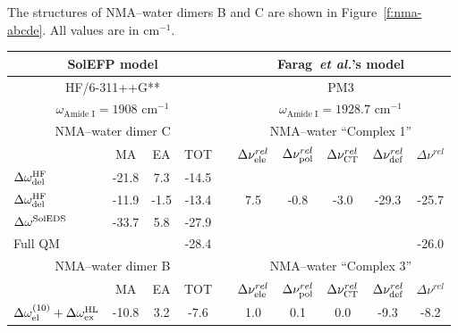 \documentclass[b5paper,oneside,fleqn,11pt]{book}
\begin{document}
\begin{refsection}
\begin{table}
{The structures of NMA--water dimers B and C are shown in
Figure~\ref{f:nma-abcde}. All values are in cm$^{-1}$.
\label{t:farag}}
\begin{tabular*}{1.0\textwidth}{@{\extracolsep{\fill} } lccccccccc}
\hline\hline
\multicolumn{4}{c}{SolEFP model}       && \multicolumn{5}{c}{Farag~\emph{et al.}'s model} \\
\hline
\multicolumn{4}{c}{HF/6-311++G**}      && \multicolumn{5}{c}{PM3} \\
   \multicolumn{4}{c}{$\omega_{\text{Amide I}}=1908\text{ cm}^{-1}$}      
&& \multicolumn{5}{c}{$\omega_{\text{Amide I}}=1928.7\text{ cm}^{-1}$} \\
%
\hline
%
\multicolumn{4}{c}{NMA--water dimer C} && \multicolumn{5}{c}{NMA--water ``Complex 1''} \\
\cline{1-4} \cline{6-10}
 & MA & EA & TOT && $\Delta\nu_{\rm ele}^{rel}$ & $\Delta\nu_{\rm pol}^{rel}$ & $\Delta\nu_{\rm CT}^{rel}$ & $\Delta\nu_{\rm def}^{rel}$ &
                       $\Delta\nu^{rel}$ \\
\cline{2-4} \cline{6-10}
 $\Delta\omega^{\rm HF}_{\rm del}$  
          & -21.8 &  7.3  & -14.5 && \multirow{3}{*}{  7.5} &
                                     \multirow{3}{*}{ -0.8} &
                                     \multirow{3}{*}{ -3.0} &
                                     \multirow{3}{*}{-29.3} &
                                     \multirow{3}{*}{-25.7} \\ 
 $\Delta\omega^{\rm HF}_{\rm del}$    
          & -11.9 & -1.5  & -13.4 && & & & &       \\
 $\Delta\omega^{\rm SolEDS}$    
          & -33.7 &  5.8  & -27.9 && & & & &       \\
 Full QM  &      &        & -28.4 && & & & & -26.0 \\
%
\hline
%
\multicolumn{4}{c}{NMA--water dimer B} && \multicolumn{5}{c}{NMA--water ``Complex 3''} \\
\cline{1-4} \cline{6-10}
 & MA & EA & TOT && $\Delta\nu_{\rm ele}^{rel}$ & $\Delta\nu_{\rm pol}^{rel}$ & $\Delta\nu_{\rm CT}^{rel}$ & $\Delta\nu_{\rm def}^{rel}$ &
                       $\Delta\nu^{rel}$ \\
\cline{2-4} \cline{6-10}
 $\Delta\omega^{(10)}_{\rm el}+\Delta\omega^{\rm HL}_{\rm ex}$ 
          & -10.8 &  3.2  &  -7.6 && \multirow{3}{*}{  1.0} &
                                     \multirow{3}{*}{  0.1} &
                                     \multirow{3}{*}{  0.0} &
                                     \multirow{3}{*}{ -9.3} &
                                     \multirow{3}{*}{ -8.2} \\ 

\end{tabular*}
\end{table}
\end{refsection}
\end{document}
